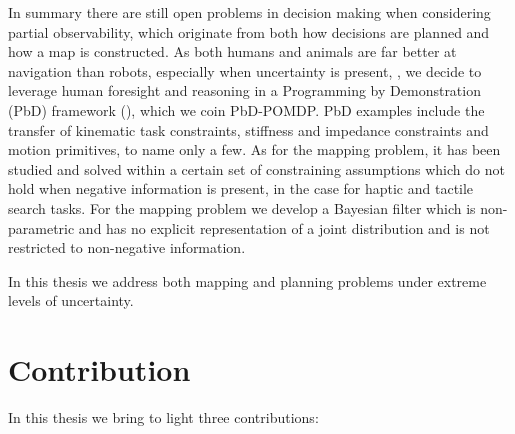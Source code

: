 In summary there are still open problems in decision making when considering partial observability, which 
originate from both how decisions are planned and how a map is constructed.
As both humans and animals are far better at navigation than robots, especially when uncertainty is present, 
\cite{stankiewicz2006lost}, we decide to leverage human foresight and reasoning in a Programming by Demonstration 
(PbD) framework (\cite{Billard08chapter}), which we coin PbD-POMDP. PbD examples include the transfer of kinematic task constraints, 
stiffness and impedance constraints and motion primitives, to name only a few. As for the mapping problem, it has been studied 
and solved within a certain set of constraining assumptions which do not hold when negative information is present, in 
the case for haptic and tactile search tasks. For the mapping problem we develop a Bayesian filter which is non-parametric and has no explicit 
representation of a joint distribution and is not restricted to non-negative information.

In this thesis we address both mapping and planning problems under extreme levels of uncertainty. 



\section{Contribution}
%	
%

In this thesis we bring to light three contributions:

